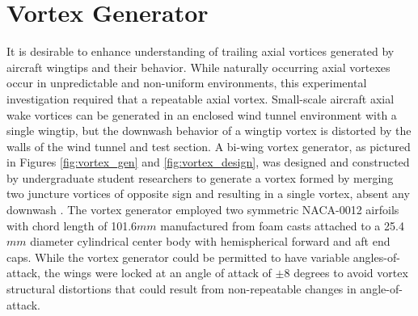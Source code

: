 \section{Vortex Generator}

It is desirable to enhance understanding of 
trailing axial vortices generated by aircraft wingtips and their behavior.
While naturally occurring axial vortexes occur in unpredictable and non-uniform 
environments, this experimental investigation required that a repeatable axial 
vortex.  Small-scale aircraft axial wake vortices can be generated in an 
enclosed wind tunnel environment with a single wingtip, but the downwash 
behavior of a wingtip vortex is distorted by the walls of the wind tunnel and 
test section. A bi-wing vortex generator, as pictured in Figures 
\ref{fig:vortex_gen} and \ref{fig:vortex_design}, was designed and constructed 
by undergraduate student researchers to generate a vortex formed by merging two 
juncture vortices of opposite sign and resulting in a single vortex, absent any 
downwash \cite{davis2012}. The vortex generator employed two symmetric NACA-0012
airfoils with chord length of 101.6$mm$ manufactured from foam casts attached 
to a 25.4$mm$ diameter cylindrical center body with hemispherical forward and 
aft end caps. While the vortex generator could be permitted to have variable
angles-of-attack, the wings were locked at an angle of attack of $\pm$8 degrees 
to avoid vortex structural distortions that could result from non-repeatable 
changes in angle-of-attack.

